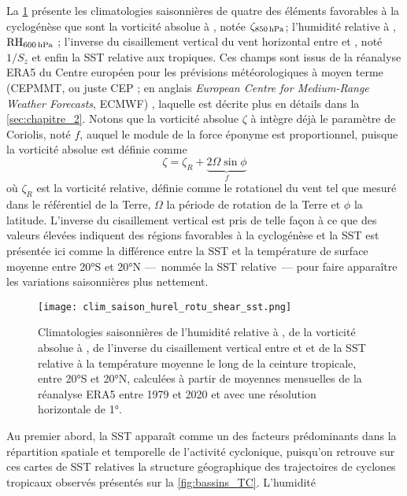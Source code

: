 \documentclass[../main.tex]{subfiles}
\begin{document}
La \cref{fig:clim_ingredients} présente les climatologies saisonnières de quatre des éléments favorables à la cyclogénèse que sont la vorticité absolue à
, notée $\zeta_{\text{\hPa{850}}}$; l'humidité relative à , $\text{RH}_{\text{\hPa{600}}}$ ; l'inverse du cisaillement vertical du vent
horizontal entre  et , noté $1/S_z$ et enfin la SST relative aux tropiques. Ces champs sont issus de la réanalyse ERA5 du Centre européen pour
les prévisions météorologiques à moyen terme (CEPMMT, ou juste CEP ; en anglais \textit{European Centre for Medium-Range Weather Forecasts}, ECMWF)
\parencite{hersbach_era5_2020}, laquelle est décrite plus en détails dans la \cref{sec:chapitre_2}. Notons que la vorticité absolue $\zeta$ à  intègre
déjà le paramètre de Coriolis, noté $f$, auquel le module de la force éponyme est proportionnel, puisque la vorticité absolue est définie comme
\begin{equation*}
    \zeta = \zeta_R + \underbrace{2 \Omega \sin \phi}_{f}
\end{equation*}
\noindent où $\zeta_R$ est la vorticité relative, définie comme le rotationel du vent tel que mesuré dans le référentiel de la Terre, $\Omega$ la période de
rotation de la Terre et $\phi$ la latitude. L'inverse du cisaillement vertical est pris de telle façon à ce que des valeurs élevées indiquent des régions
favorables à la cyclogénèse et la SST est présentée ici comme la différence entre la SST et la température de surface moyenne entre \ang{20}S et \ang{20}N
---~nommée la SST relative~--- pour faire apparaître les variations saisonnières plus nettement.
%
\begin{figure}[tp]
    \centering
    \texttt{[image: clim\_saison\_hurel\_rotu\_shear\_sst.png]}
    \caption{Climatologies saisonnières de l'humidité relative à , de la vorticité absolue à , de l'inverse du cisaillement vertical entre
     et  et de la SST relative à la température moyenne le long de la ceinture tropicale, entre \ang{20}S et \ang{20}N, calculées à partir de
    moyennes mensuelles de la réanalyse ERA5 entre 1979 et 2020 et avec une résolution horizontale de \ang{1}.}
    \label{fig:clim_ingredients}
\end{figure}
%
Au premier abord, la SST apparaît comme un des facteurs prédominants dans la répartition spatiale et temporelle de l'activité cyclonique, puisqu'on retrouve sur
ces cartes de SST relatives la structure géographique des trajectoires de cyclones tropicaux observés présentés sur la \cref{fig:bassins_TC}. L'humidité
\end{document}

